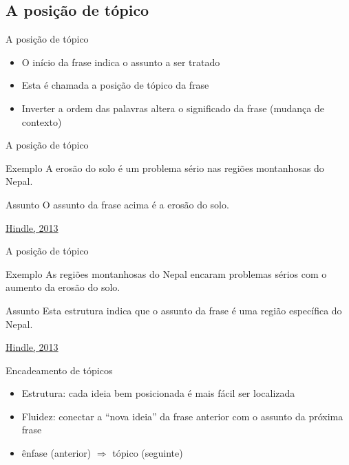 \documentclass{beamer}
\begin{document}
\subsection{A posição de tópico}

\begin{frame}{A posição de tópico}
  \begin{itemize}
    \footnotesize
  \item O início da frase indica o assunto a ser tratado
    \medskip
  \item Esta é chamada a \alert{posição de tópico} da frase
    \medskip
  \item Inverter a ordem das palavras altera o significado da frase
    (mudança de contexto)
  \end{itemize}
\end{frame}

\begin{frame}{A posição de tópico}
  \begin{exampleblock}{Exemplo}
    \footnotesize
    A \alert<2->{erosão do solo} é um problema sério nas regiões
    montanhosas do Nepal.
  \end{exampleblock}
  \begin{block}{Assunto}
    \footnotesize
    O assunto da frase acima é a \alert<2->{erosão do solo}.
  \end{block}

  \vfill
  \scriptsize
  \hfill \href{https://web.archive.org/web/20150512123007/http://www.edanzediting.com/blog/reader_expectations_topic_position}
  {Hindle, 2013}
\end{frame}

\begin{frame}{A posição de tópico}
  \begin{exampleblock}{Exemplo}
    \footnotesize
    As \alert<2->{regiões montanhosas do Nepal} encaram problemas sérios com o
    aumento da erosão do solo.
  \end{exampleblock}
  \begin{block}{Assunto}
    \footnotesize
    Esta estrutura indica que o assunto da frase é \alert<2->{uma
      região específica} do Nepal.
  \end{block}

  \vfill
  \scriptsize
  \hfill \href{https://web.archive.org/web/20150512123007/http://www.edanzediting.com/blog/reader_expectations_topic_position}
  {Hindle, 2013}
\end{frame}

\begin{frame}{Encadeamento de tópicos}
  \begin{itemize}
    \footnotesize
  \item Estrutura: cada ideia bem posicionada é mais fácil ser
    localizada
  \item Fluidez: conectar a ``nova ideia'' da frase anterior com o
    assunto da próxima frase
  \item ênfase (anterior) $\Rightarrow$ tópico (seguinte)
  \end{itemize}
\end{frame}
\end{document}
